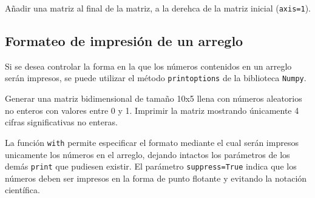 \begin{code}
Añadir una matriz al final de la matriz, a la derehca de la matriz inicial (\texttt{axis=1}).

\begin{Shaded}
\begin{Highlighting}[]
\OperatorTok{=}\NormalTok{ np.append([[}\NormalTok{, }\NormalTok{], [}\NormalTok{, }\NormalTok{]], [[}\NormalTok{, }\NormalTok{], [}\NormalTok{, }\NormalTok{]], axis}\OperatorTok{=}\NormalTok{)}

\end{Highlighting}
\end{Shaded}
\end{code}

\subsection{Formateo de impresión de un arreglo}

Si se desea controlar la forma en la que los números contenidos en un
arreglo serán impresos, se puede utilizar el método
\texttt{printoptions} de la biblioteca \texttt{Numpy}.\\

\begin{code}
Generar una matriz bidimensional de tamaño 10x5 llena
con números aleatorios no enteros con valores entre 0 y 1. Imprimir la
matriz mostrando únicamente 4 cifras significativas no enteras.

\begin{Shaded}
\begin{Highlighting}[]
\OperatorTok{=}\NormalTok{,}\NormalTok{)}
        \OperatorTok{=}\OperatorTok{=}\NormalTok{):}
\OperatorTok{=}\NormalTok{\{}\NormalTok{: }\StringTok{\textquotesingle{}}\StringTok{\textquotesingle{}}\NormalTok{\})}

\end{Highlighting}
\end{Shaded}
\end{code}

La función \texttt{with} permite especificar el formato mediante el cual
serán impresos unicamente los números en el arreglo, dejando intactos
los parámetros de los demás \texttt{print} que pudiesen existir. El
parámetro \texttt{suppress=True} indica que los números deben ser
impresos en la forma de punto flotante y evitando la notación
científica. 
